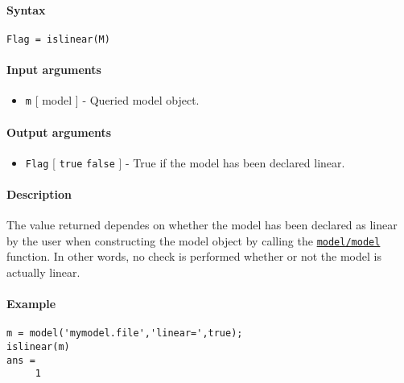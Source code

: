 


	\paragraph{Syntax}

\begin{verbatim}
Flag = islinear(M)
\end{verbatim}

\paragraph{Input arguments}

\begin{itemize}
\itemsep1pt\parskip0pt
\item
  \texttt{m} {[} model {]} - Queried model object.
\end{itemize}

\paragraph{Output arguments}

\begin{itemize}
\itemsep1pt\parskip0pt
\item
  \texttt{Flag} {[} \texttt{true} \textbar{} \texttt{false} {]} - True
  if the model has been declared linear.
\end{itemize}

\paragraph{Description}

The value returned dependes on whether the model has been declared as
linear by the user when constructing the model object by calling the
\href{model/model}{\texttt{model/model}} function. In other words, no
check is performed whether or not the model is actually linear.

\paragraph{Example}

\begin{verbatim}
m = model('mymodel.file','linear=',true);
islinear(m)
ans =
     1
\end{verbatim}


